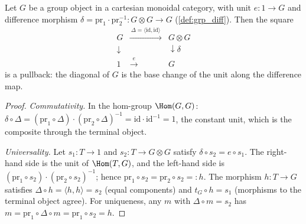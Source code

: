 \begin{theorem}
  \label{thm:grp_diagonal_pullback}
  \leanok
  Let \(G\) be a group object in a cartesian monoidal category, with unit
  \(e : 1 \to G\) and difference morphism
  \(\delta = \mathrm{pr}_1 \cdot \mathrm{pr}_2^{-1} : G \otimes G \to G\)
  (\ref{def:grp_diff}). Then the square
  \[
    \begin{array}{ccc}
      G & \xrightarrow{\ \Delta = \langle \mathrm{id}, \mathrm{id}\rangle\ }
        & G \otimes G \\
      \downarrow & & \downarrow \delta \\
      1 & \xrightarrow{\ e\ } & G
    \end{array}
  \]
  is a pullback: the diagonal of \(G\) is the base change of the unit along
  the difference map.
\end{theorem}
\begin{proof}
  \leanok
  \emph{Commutativity.} In the hom-group \(\Hom(G, G)\):
  \(\delta \circ \Delta = (\mathrm{pr}_1 \circ \Delta)\cdot(\mathrm{pr}_2
  \circ \Delta)^{-1} = \mathrm{id} \cdot \mathrm{id}^{-1} = 1\), the constant
  unit, which is the composite through the terminal object.

  \emph{Universality.} Let \(s_1 : T \to 1\) and \(s_2 : T \to G \otimes G\)
  satisfy \(\delta \circ s_2 = e \circ s_1\). The right-hand side is the unit
  of \(\Hom(T, G)\), and the left-hand side is
  \((\mathrm{pr}_1 \circ s_2)\cdot(\mathrm{pr}_2 \circ s_2)^{-1}\); hence
  \(\mathrm{pr}_1 \circ s_2 = \mathrm{pr}_2 \circ s_2 =: h\). The morphism
  \(h : T \to G\) satisfies \(\Delta \circ h = \langle h, h \rangle = s_2\)
  (equal components) and \(t_G \circ h = s_1\) (morphisms to the terminal
  object agree). For uniqueness, any \(m\) with \(\Delta \circ m = s_2\) has
  \(m = \mathrm{pr}_1 \circ \Delta \circ m = \mathrm{pr}_1 \circ s_2 = h\).
\end{proof}

